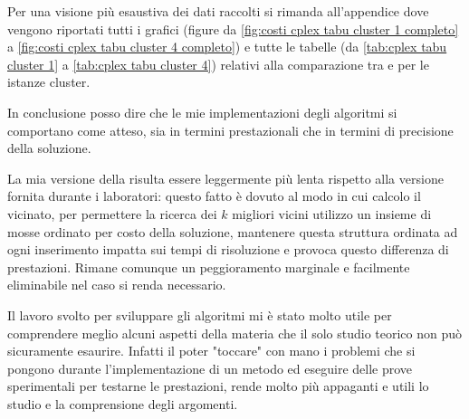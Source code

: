 Per una visione più esaustiva dei dati raccolti si rimanda all'appendice dove vengono riportati tutti i grafici (figure da \ref{fig:costi cplex tabu cluster 1 completo} a \ref{fig:costi cplex tabu cluster 4 completo}) e tutte le tabelle (da \ref{tab:cplex tabu cluster 1} a \ref{tab:cplex tabu cluster 4}) relativi alla comparazione tra  e \tabu per le istanze cluster.

In conclusione posso dire che le mie implementazioni degli algoritmi si comportano come atteso, sia in termini prestazionali che in termini di precisione della soluzione.

La mia versione della \tabu risulta essere leggermente più lenta rispetto alla versione fornita durante i laboratori: questo fatto è dovuto al modo in cui calcolo il vicinato, per permettere la ricerca dei $k$ migliori vicini utilizzo un insieme di mosse ordinato per costo della soluzione, mantenere questa struttura ordinata ad ogni inserimento impatta sui tempi di risoluzione e provoca questo differenza di prestazioni.
Rimane comunque un peggioramento marginale e facilmente eliminabile nel caso si renda necessario.

Il lavoro svolto per sviluppare gli algoritmi mi è stato molto utile per comprendere meglio alcuni aspetti della materia che il solo studio teorico non può sicuramente esaurire. Infatti il poter "toccare" con mano i problemi che si pongono durante l'implementazione di un metodo ed eseguire delle prove sperimentali per testarne le prestazioni, rende molto più appaganti e utili lo studio e la comprensione degli argomenti.